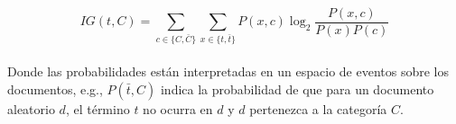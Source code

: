 	\begin{equation}
		IG(t, C) = \sum_{c \in \{C, \bar{C}\}} \sum_{x \in \{t, \bar{t}\}} P(x, c) \log_2\frac{P(x, c)}{P(x)P(c)}
	\end{equation}
	\\
	Donde las probabilidades están interpretadas en un espacio de eventos sobre los documentos, e.g., $P(\bar{t}, C)$ indica la probabilidad de que para un documento aleatorio $d$, el término $t$ no ocurra en $d$ y $d$ pertenezca a la categoría $C$. 
